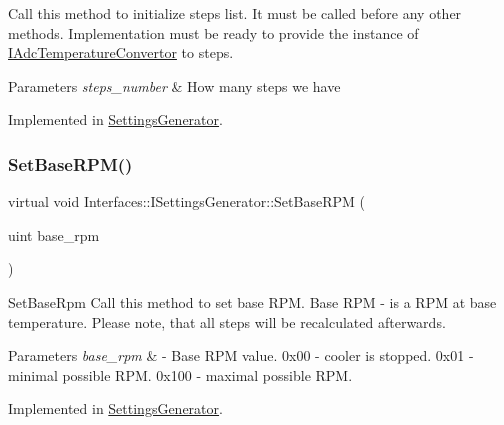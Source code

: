 Call this method to initialize steps list. It must be called before any other methods. Implementation must be ready to provide the instance of \hyperlink{class_interfaces_1_1_i_adc_temperature_convertor}{I\+Adc\+Temperature\+Convertor} to steps. 


\begin{DoxyParams}{Parameters}
{\em steps\+\_\+number} & How many steps we have \\
\hline
\end{DoxyParams}


Implemented in \hyperlink{class_settings_generator_a84b81d11cb5f83d4066e73a03acfc143}{Settings\+Generator}.

\mbox{\label{class_interfaces_1_1_i_settings_generator_a4caf07447d0930440d9f21318892244c}} 
\subsubsection{\texorpdfstring{Set\+Base\+R\+P\+M()}{SetBaseRPM()}}
{\footnotesize\ttfamily virtual void Interfaces\+::\+I\+Settings\+Generator\+::\+Set\+Base\+R\+PM (\begin{DoxyParamCaption}\item[{uint}]{base\+\_\+rpm }\end{DoxyParamCaption})\hspace{0.3cm}{\ttfamily [pure virtual]}}



Set\+Base\+Rpm Call this method to set base R\+PM. Base R\+PM -\/ is a R\+PM at base temperature. Please note, that all steps will be recalculated afterwards. 


\begin{DoxyParams}{Parameters}
{\em base\+\_\+rpm} & -\/ Base R\+PM value. 0x00 -\/ cooler is stopped. 0x01 -\/ minimal possible R\+PM. 0x100 -\/ maximal possible R\+PM. \\
\hline
\end{DoxyParams}


Implemented in \hyperlink{class_settings_generator_a1c1960b9021f7081b4c42c4d7c0eda34}{Settings\+Generator}.

\mbox{\label{class_interfaces_1_1_i_settings_generator_a8b60ba05790994db0303b251f655e95d}} 
